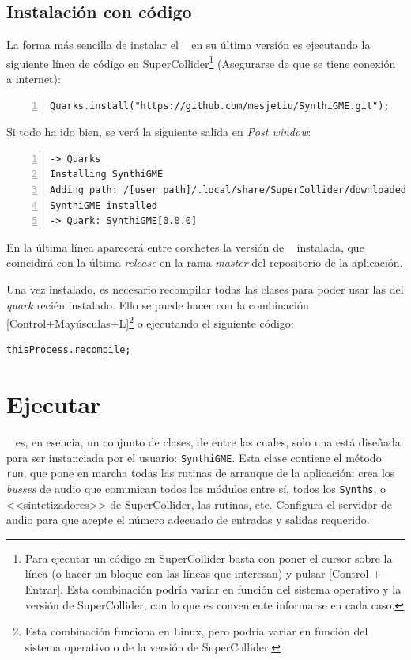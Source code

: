 \subsection{Instalación con código}

La forma más sencilla de instalar el \appName~ en su última versión es ejecutando la siguiente línea de código en SuperCollider\footnote{Para ejecutar un código en SuperCollider basta con poner el cursor sobre la línea (o hacer un bloque con las líneas que interesan) y pulsar [Control + Entrar]. Esta combinación podría variar en función del sistema operativo y la versión de SuperCollider, con lo que es conveniente informarse en cada caso.} (Asegurarse de que se tiene conexión a internet):

\begin{lstlisting}[style=SuperCollider-IDE, frame=single, numbers=left]
Quarks.install("https://github.com/mesjetiu/SynthiGME.git");
\end{lstlisting}

Si todo ha ido bien, se verá la siguiente salida en \textit{Post window}:

\begin{lstlisting}[frame=single, numbers=left]
-> Quarks
Installing SynthiGME
Adding path: /[user path]/.local/share/SuperCollider/downloaded-quarks/SynthiGME
SynthiGME installed
-> Quark: SynthiGME[0.0.0]
\end{lstlisting}

En la última línea aparecerá entre corchetes la versión de \appName~ instalada, que coincidirá con la última \textit{release} en la rama \textit{master} del repositorio de la aplicación.

Una vez instalado, es necesario recompilar todas las clases para poder usar las del \textit{quark} recién instalado. Ello se puede hacer con la combinación [Control+Mayúsculas+L]\footnote{Esta combinación funciona en Linux, pero podría variar en función del sistema operativo o de la versión de SuperCollider.} o ejecutando el siguiente código:

\begin{lstlisting}[style=SuperCollider-IDE, frame=single]
thisProcess.recompile;
\end{lstlisting}


\section{Ejecutar \appName}

\appName~ es, en esencia, un conjunto de clases, de entre las cuales, solo una está diseñada para ser instanciada por el usuario: \texttt{SynthiGME}. Esta clase contiene el método \texttt{run}, que pone en marcha todas las rutinas de arranque de la aplicación: crea los \textit{busses} de audio que comunican todos los módulos entre sí, todos los \texttt{Synths}, o <<sintetizadores>> de SuperCollider, las rutinas, etc. Configura el servidor de audio para que acepte el número adecuado de entradas y salidas requerido.

